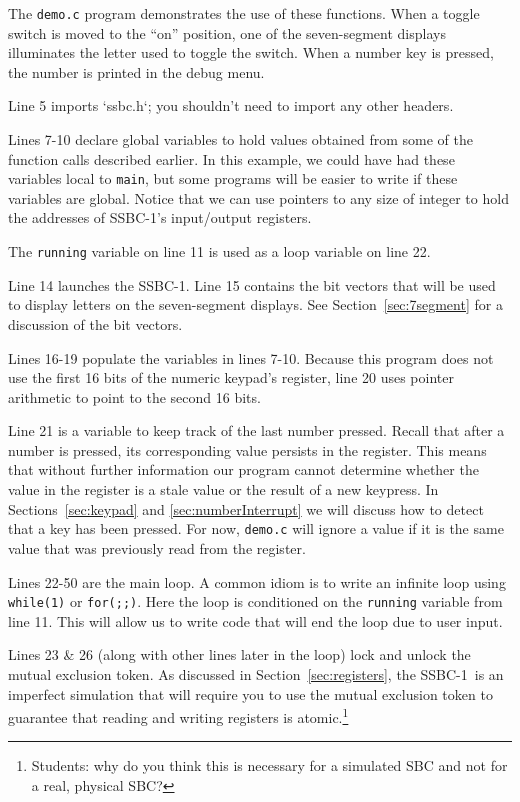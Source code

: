 \documentclass[12pt]{article}
\newcommand{\SSBC}{SSBC-1}
\begin{document}
The \texttt{demo.c} program demonstrates the use of these functions. When a
toggle switch is moved to the ``on'' position, one of the seven-segment
displays illuminates the letter used to toggle the switch. When a number key is
pressed, the number is printed in the debug menu.



Line 5 imports `ssbc.h`; you shouldn't need to import any other headers.

Lines 7-10 declare global variables to hold values obtained from some of the
function calls described earlier. In this example, we could have had these
variables local to \texttt{main}, but some programs will be easier to write if
these variables are global. Notice that we can use pointers to any size of
integer to hold the addresses of \SSBC's input/output registers.

The \texttt{running} variable on line 11 is used as a loop variable on line 22.

Line 14 launches the \SSBC. Line 15 contains the bit vectors that will be used
to display letters on the seven-segment displays. See
Section~\ref{sec:7segment} for a discussion of the bit vectors.

Lines 16-19 populate the variables in lines 7-10. Because this program does not
use the first 16 bits of the numeric keypad's register, line 20 uses pointer
arithmetic to point to the second 16 bits.

Line 21 is a variable to keep track of the last number pressed. Recall that
after a number is pressed, its corresponding value persists in the register.
This means that without further information our program cannot determine
whether the value in the register is a stale value or the result of a new
keypress. In Sections~\ref{sec:keypad} and \ref{sec:numberInterrupt} we will
discuss how to detect that a key has been pressed. For now, \texttt{demo.c}
will ignore a value if it is the same value that was previously read from the
register.

Lines 22-50 are the main loop. A common idiom is to write an infinite loop
using \texttt{while(1)} or \texttt{for(;;)}. Here the loop is conditioned on
the \texttt{running} variable from line 11. This will allow us to write code
that will end the loop due to user input.

Lines 23 \& 26 (along with other lines later in the loop) lock and unlock the
mutual exclusion token. As discussed in Section~\ref{sec:registers}, the \SSBC\
is an imperfect simulation that will require you to use the mutual exclusion
token to guarantee that reading and writing registers is
atomic.\footnote{Students: why do you think this is necessary for a simulated
SBC and not for a real, physical SBC?}
\end{document}
